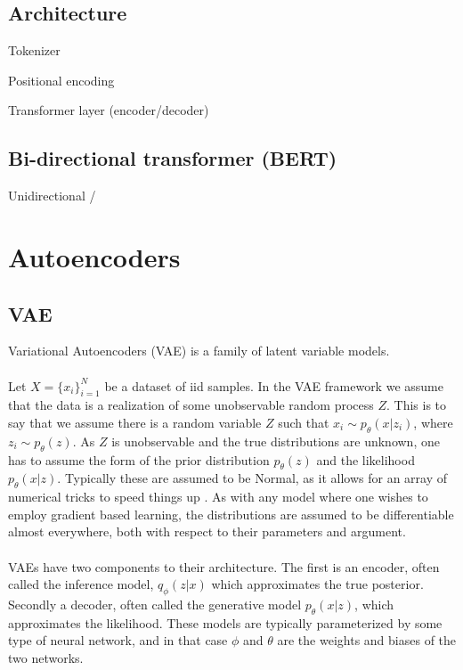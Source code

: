 \documentclass[../../thesis.tex]{subfiles}
\begin{document}
\subsection{Architecture}

Tokenizer

Positional encoding


Transformer layer (encoder/decoder)

\subsection{Bi-directional transformer (BERT)}

Unidirectional / 




\section{Autoencoders}


\subsection{VAE}
Variational Autoencoders (VAE) is a family of latent variable models. 
\\\\

Let $X = \{x_i\}_{i=1}^{N}$ be a dataset of iid samples. In the VAE framework we assume that the data is a realization of some unobservable random process $Z$. This is to say that we assume there is a random variable $Z$ such that $x_i \sim p_{\theta}(x|z_i)$, where $z_i \sim p_{\theta}(z)$. As $Z$ is unobservable and the true distributions are unknown, one has to assume the form of the prior distribution $p_{\theta}(z)$ and the likelihood $p_{\theta}(x|z)$. Typically these are assumed to be Normal, as it allows for an array of numerical tricks to speed things up . As with any model where one wishes to employ gradient based learning, the distributions are assumed to be differentiable almost everywhere, both with respect to their parameters and argument. \\\\
VAEs have two components to their architecture. The first is an encoder, often called the inference model, $q_\phi(z|x)$ which approximates the true posterior. Secondly a decoder, often called the generative model $p_\theta(x|z)$, which approximates the likelihood. These models are typically parameterized by some type of neural network, and in that case $\phi$ and $\theta$ are the weights and biases of the two networks. 
\end{document}
